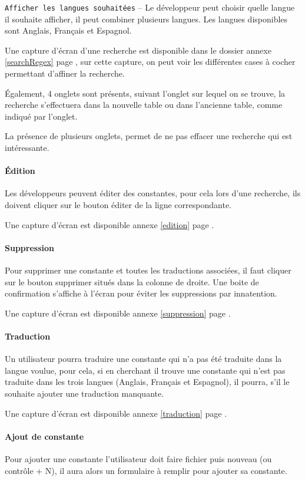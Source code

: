             \texttt{Afficher les langues souhaitées} -- Le développeur peut choisir quelle langue il souhaite afficher, il peut combiner plusieurs langues. Les langues disponibles sont Anglais, Français et Espagnol.

            Une capture d'écran d'une recherche est disponible dans le dossier annexe \ref{searchRegex} page \pageref{searchRegex}, sur cette capture, on peut voir les différentes cases à cocher permettant d'affiner la recherche.

            \'Egalement, 4 onglets sont présents, suivant l'onglet sur lequel on se trouve, la recherche s'effectuera dans la nouvelle table ou dans l'ancienne table, comme indiqué par l'onglet.

            La présence de plusieurs onglets, permet de ne pas effacer une recherche qui est intéressante.

        \paragraph{\'Edition}
        Les développeurs peuvent éditer des constantes, pour cela lors d'une recherche, ils doivent cliquer sur le bouton éditer de la ligne correspondante.

        Une capture d'écran est disponible annexe \ref{edition} page \pageref{edition}.
        \paragraph{Suppression}
            Pour supprimer une constante et toutes les traductions associées, il faut cliquer sur le bouton supprimer situés dans la colonne de droite. Une boite de confirmation s'affiche à l'écran pour éviter les suppressions par innatention.

        Une capture d'écran est disponible annexe \ref{suppression} page \pageref{suppression}.
        \paragraph{Traduction}
            Un utilisateur pourra traduire une constante qui n'a pas été traduite dans la langue voulue, pour cela, si en cherchant il trouve une constante qui n'est pas traduite dans les trois langues (Anglais, Français et Espagnol), il pourra, s'il le souhaite ajouter une traduction manquante.

        Une capture d'écran est disponible annexe \ref{traduction} page \pageref{traduction}.
        \paragraph{Ajout de constante}
            Pour ajouter une constante l'utilisateur doit faire fichier puis nouveau (ou contrôle + N), il aura alors un formulaire à remplir pour ajouter sa constante.

